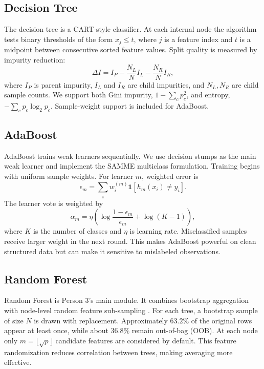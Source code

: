\documentclass[11pt,twocolumn]{article}
\begin{document}
\subsection{Decision Tree}
The decision tree is a CART-style classifier. At each internal node the algorithm tests binary thresholds of the form $x_j \leq t$, where $j$ is a feature index and $t$ is a midpoint between consecutive sorted feature values. Split quality is measured by impurity reduction:
\begin{equation}
\Delta I = I_P - \frac{N_L}{N} I_L - \frac{N_R}{N} I_R,
\end{equation}
where $I_P$ is parent impurity, $I_L$ and $I_R$ are child impurities, and $N_L,N_R$ are child sample counts. We support both Gini impurity, $1-\sum_c p_c^2$, and entropy, $-\sum_c p_c\log_2 p_c$. Sample-weight support is included for AdaBoost.

\subsection{AdaBoost}
AdaBoost trains weak learners sequentially. We use decision stumps as the main weak learner and implement the SAMME multiclass formulation. Training begins with uniform sample weights. For learner $m$, weighted error is
\begin{equation}
\epsilon_m = \sum_i w_i^{(m)} \mathbf{1}[h_m(x_i) \neq y_i].
\end{equation}
The learner vote is weighted by
\begin{equation}
\alpha_m = \eta\left(\log\frac{1-\epsilon_m}{\epsilon_m}+\log(K-1)\right),
\end{equation}
where $K$ is the number of classes and $\eta$ is learning rate. Misclassified samples receive larger weight in the next round. This makes AdaBoost powerful on clean structured data but can make it sensitive to mislabeled observations.

\subsection{Random Forest}
Random Forest is Person 3's main module. It combines bootstrap aggregation with node-level random feature sub-sampling \cite{breiman2001random}. For each tree, a bootstrap sample of size $N$ is drawn with replacement. Approximately $63.2\%$ of the original rows appear at least once, while about $36.8\%$ remain out-of-bag (OOB). At each node only $m=\lfloor\sqrt{p}\rfloor$ candidate features are considered by default. This feature randomization reduces correlation between trees, making averaging more effective.
\end{document}
